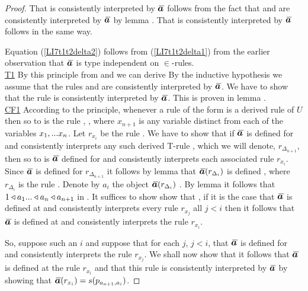 \begin{proof}
That    is consistently interpreted by $\Ibar$ follows 
from the fact that   and  
are consistently interpreted by $\Ibar$ by lemma .
That    is consistently interpreted by $\Ibar$ follows in the same way.

Equation (\ref{LI7t1t2delta2}) follows from (\ref{LI7t1t2delta1}) from the earlier observation that $\Ibar$ is type independent on $\in$-rules. \\
\underline{T1}
By this principle from  and  we can derive 
By the inductive hypothesis we assume that the rules    and  are
consistently interpreted by $\Ibar$. We have to show that the rule  is consistently interpreted by $\Ibar$.
This is proven in lemma . \\
%
%
\underline{CF1} According to the principle, 
whenever a rule of the form  is a derived rule of $U$ 
then so to is the rule , \foreachi[n+1], 
where $x_{n+1}$ is any variable distinct from each of the variables $x_1,...x_n$.
Let $r_{x_i}$ be the rule .
We have to show that if $\Ibar$ is defined for and consistently interprets any such derived T-rule
, 
which we will denote, $r_{\Delta_{n+1}}$, 
then so to is $\Ibar$ defined for and consistently interprets each associated rule $r_{x_i}$. 
Since $\Ibar$ is defined for $r_{\Delta_{n+1}}$ it follows by lemma  that 
$\Ibar(r_{\Delta_i})$ is defined \foreachi[n+1], where $r_{\Delta_i}$ is the rule .
Denote by $a_i$ the object  $\Ibar(r_{\Delta_i})$ \foreachi[n+1]. By lemma 
it follows that $1 \triangleleft a_1 ... \triangleleft a_n \triangleleft a_{n+1}$ in \catc.  
It suffices to show show that \foreachi[n+1],
if it is the case that $\Ibar$ is defined at and consistently interprets every rule $r_{x_j}$ all $j <i$ 
then it follows that $\Ibar$ is defined at and consistently interprets the rule $r_{x_i}$. 

So, suppose such an $i$ and suppose that for each $j$, $j < i$, 
that $\Ibar$ is defined for and consistently interprets the rule $r_{x_j}$. 
We shall now show that it follows that 
$\Ibar$ is defined at the rule $r_{x_i}$ and that this rule is consistently interpreted by $\Ibar$ by showing that
$\Ibar(r_{x_i})=s(p_{a_{n+1},a_i})$. 


\end{proof}
